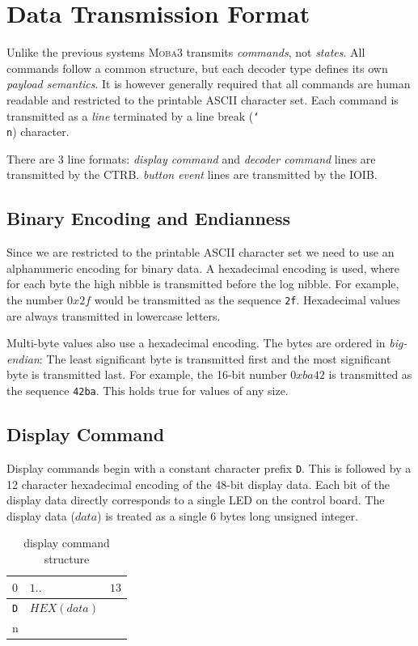 \documentclass{scrreprt}
\newcommand\n{\char`\\n}
\begin{document}
\section{Data Transmission Format}
Unlike the previous systems \textsc{Moba3} transmits \emph{commands}, not \emph{states}. All commands follow a common structure, but each decoder type defines its own \emph{payload semantics}. It is however generally required that all commands are human readable and restricted to the printable ASCII character set.
Each command is transmitted as a \emph{line} terminated by a line break (\texttt{\n}) character.

There are 3 line formats:
\emph{display command} and \emph{decoder command} lines are transmitted by the CTRB.
\emph{button event} lines are transmitted by the IOIB.

\subsection{Binary Encoding and Endianness}
Since we are restricted to the printable ASCII character set we need to use an alphanumeric encoding for binary data.
A hexadecimal encoding is used, where for each byte the high nibble is transmitted before the log nibble.
For example, the number $0x2f$ would be transmitted as the sequence \texttt{2f}.
Hexadecimal values are always transmitted in lowercase letters.

Multi-byte values also use a hexadecimal encoding.
The bytes are ordered in \emph{big-endian}:
The least significant byte is transmitted first and the most significant byte is transmitted last.
For example, the 16-bit number $0xba42$ is transmitted as the sequence \texttt{42ba}.
This holds true for values of any size.

\subsection{Display Command}
Display commands begin with a constant character prefix \texttt{D}.
This is followed by a 12 character hexadecimal encoding of the 48-bit display data.
Each bit of the display data directly corresponds to a single LED on the control board.
The display data ($data$) is treated as a single 6 bytes long unsigned integer.

\begin{table}[ht!]
\centering
\begin{tabular}{ |l|l|l| } 
\multicolumn{1}{l}{$0$} & \multicolumn{1}{l}{$1..$} & \multicolumn{1}{l}{$13$} \\ \hline
\texttt{D} & $HEX(data)$ & \texttt{\n} \\\hline
\end{tabular}
\caption{display command structure}
\end{table}
\end{document}
